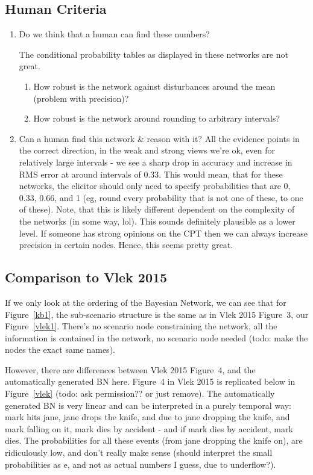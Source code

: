 \subsection{Human Criteria}
\begin{enumerate}
\item Do we think that a human can find these numbers?

The conditional probability tables as displayed in these networks are not great.

	\begin{enumerate}
	\item How robust is the network against disturbances around the mean (problem with precision)?
	\item How robust is the network around rounding to arbitrary intervals?
	\end{enumerate}
	
\item Can a human find this network \& reason with it? All the evidence points in the correct direction, in the weak and strong views we're ok, even for relatively large intervals - we see a sharp drop in accuracy and increase in RMS error at around intervals of 0.33. This would mean, that for these networks, the elicitor should only need to specify probabilities that are 0, 0.33, 0.66, and 1 (eg, round every probability that is not one of these, to one of these). Note, that this is likely different dependent on the complexity of the networks (in some way, lol). This sounds definitely plausible as a lower level. If someone has strong opinions on the CPT then we can always increase precision in certain nodes. Hence, this seems pretty great.


\end{enumerate}




\subsection{Comparison to Vlek 2015}
If we only look at the ordering of the Bayesian Network, we can see that for Figure~\ref{kb1}, the sub-scenario structure is the same as in Vlek 2015 Figure~3, our Figure~\ref{vlek1}. There's no scenario node constraining the network, all the information is contained in the network, no scenario node needed (todo: make the nodes the exact same names).

However, there are differences between Vlek 2015 Figure~4, and the automatically generated BN here. Figure~4 in Vlek 2015 is replicated below in Figure~\ref{vlek} (todo: ask permission?? or just remove). The automatically generated BN is very linear and can be interpreted in a purely temporal way: mark hits jane, jane drops the knife, and due to jane dropping the knife, and mark falling on it, mark dies by accident - and if mark dies by accident, mark dies. The probabilities for all these events (from jane dropping the knife on), are ridiculously low, and don't really make sense (should interpret the small probabilities as e, and not as actual numbers I guess, due to underflow?). 

